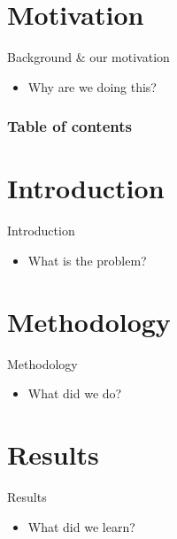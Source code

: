 \documentclass[10pt]{beamer}
\title[\presentationtitleshort]{\presentationtitle}
\author{\presentingauthor}
\institute[\instituteabbrv]{\institutename}
\date{\presentationdate}
\let\olditem\item
\renewcommand{\item}{\setlength{\itemsep}{\fill}\olditem}
\begin{document}
\frame{\titlepage}

\section{Motivation}

\begin{frame}{Background \& our motivation}
	\begin{itemize}
		\item Why are we doing this? \cite{example}
	\end{itemize}
\end{frame}

\begin{frame}
	\frametitle{Table of contents}
	\tableofcontents
\end{frame}

\section{Introduction}

\begin{frame}{Introduction}
	\begin{itemize}
		\item What is the problem?
	\end{itemize}
\end{frame}

\section{Methodology}

\begin{frame}{Methodology}
	\begin{itemize}
		\item What did we do?
	\end{itemize}
\end{frame}

\section{Results}

\begin{frame}{Results}
	\begin{itemize}
		\item What did we learn?
	\end{itemize}
\end{frame}
\end{document}
